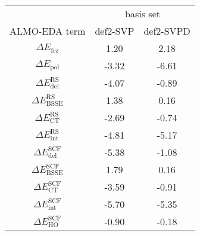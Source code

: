 \begin{tabular}{ccc}
\toprule
& \multicolumn{2}{c}{basis set} \\
ALMO-EDA term & def2-SVP & def2-SVPD \\
\midrule
\(\Delta E_{\textrm{frz}}\) & 1.20 & 2.18 \\
\(\Delta E_{\textrm{pol}}\) & -3.32 & -6.61 \\
\(\Delta E_{\textrm{del}}^{\textrm{RS}}\) & -4.07 & -0.89 \\
\(\Delta E_{\textrm{BSSE}}^{\textrm{RS}}\) & 1.38 & 0.16 \\
\(\Delta E_{\textrm{CT}}^{\textrm{RS}}\) & -2.69 & -0.74 \\
\(\Delta E_{\textrm{int}}^{\textrm{RS}}\) & -4.81 & -5.17 \\
\(\Delta E_{\textrm{del}}^{\textrm{SCF}}\) & -5.38 & -1.08 \\
\(\Delta E_{\textrm{BSSE}}^{\textrm{SCF}}\) & 1.79 & 0.16 \\
\(\Delta E_{\textrm{CT}}^{\textrm{SCF}}\) & -3.59 & -0.91 \\
\(\Delta E_{\textrm{int}}^{\textrm{SCF}}\) & -5.70 & -5.35 \\
\(\Delta E_{\textrm{HO}}^{\textrm{SCF}}\) & -0.90 & -0.18 \\
\bottomrule
\end{tabular}
